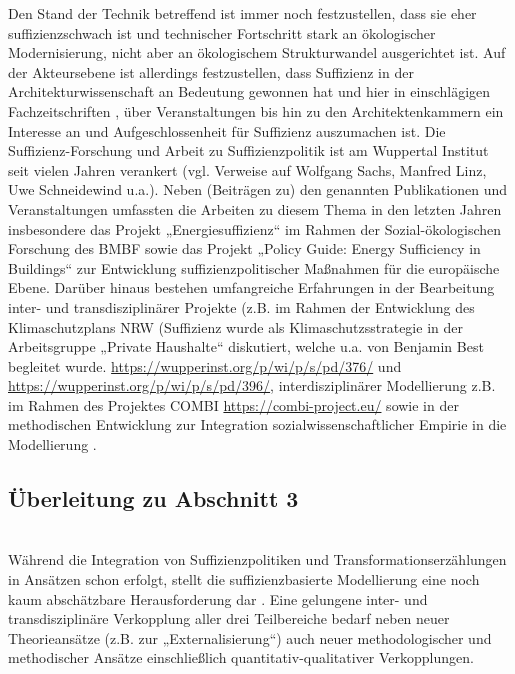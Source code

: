 \documentclass[a4paper,11pt,twoside]{scrartcl}
\begin{document}
Den Stand der Technik betreffend ist immer noch festzustellen, dass sie eher suffizienzschwach ist und technischer Fortschritt stark an ökologischer Modernisierung, nicht aber an ökologischem Strukturwandel ausgerichtet ist. Auf der Akteursebene ist allerdings festzustellen, dass Suffizienz in der Architekturwissenschaft an Bedeutung gewonnen hat und hier in einschlägigen Fachzeitschriften \cite[u.a.]{Architekt2015}, über Veranstaltungen bis hin zu den Architektenkammern ein Interesse an und Aufgeschlossenheit für Suffizienz auszumachen ist. 
Die Suffizienz-Forschung und Arbeit zu Suffizienzpolitik ist am Wuppertal Institut seit vielen Jahren verankert (vgl. Verweise auf Wolfgang Sachs, Manfred Linz, Uwe Schneidewind u.a.). Neben (Beiträgen zu) den genannten Publikationen und Veranstaltungen umfassten die Arbeiten zu diesem Thema in den letzten Jahren insbesondere das Projekt „Energiesuffizienz“ \cite{EnergiesuffizienzProjekt} im Rahmen der Sozial-ökologischen Forschung des BMBF sowie das Projekt „Policy Guide: Energy Sufficiency in Buildings“ \cite{EnergySufficiencyProjekt} zur Entwicklung suffizienzpolitischer Maßnahmen für die europäische Ebene. Darüber hinaus bestehen umfangreiche Erfahrungen in der Bearbeitung inter- und transdisziplinärer Projekte (z.B. im Rahmen der Entwicklung des Klimaschutzplans NRW (Suffizienz wurde als Klimaschutzsstrategie in der Arbeitsgruppe „Private Haushalte“ diskutiert, welche u.a. von Benjamin Best begleitet wurde. \url{https://wupperinst.org/p/wi/p/s/pd/376/} und \url{https://wupperinst.org/p/wi/p/s/pd/396/}, interdisziplinärer Modellierung z.B. im Rahmen des Projektes COMBI \url{https://combi-project.eu/} sowie in der methodischen Entwicklung zur Integration sozialwissenschaftlicher Empirie in die Modellierung \cite{Bierwirth2016}.\\


\subsection*{Überleitung zu Abschnitt 3}\\
Während die Integration von Suffizienzpolitiken und Transformationserzählungen in Ansätzen schon erfolgt, stellt die suffizienzbasierte Modellierung eine noch kaum abschätzbare Herausforderung dar \cite{Samadi2017}. Eine gelungene inter- und transdisziplinäre Verkopplung aller drei Teilbereiche bedarf neben neuer Theorieansätze (z.B. zur „Externalisierung“) auch neuer methodologischer und methodischer Ansätze einschließlich quantitativ-qualitativer Verkopplungen.
\end{document}
